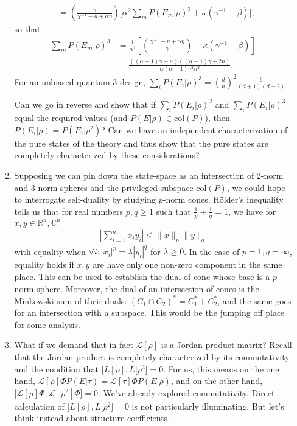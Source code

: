 \documentclass[11pt]{article}
\begin{document}
\begin{enumerate}
\begin{enumerate}
\begin{align}
	&=\left(\frac{\gamma}{\chi^{-1} -\kappa+\alpha \eta}\right)\Bigg[\alpha^2 \sum_m P(E_m|\rho)^3+  \kappa (\gamma^{-1} - \beta)\Bigg],
\end{align}
so that
\begin{align}
\sum_m P(E_m|\rho)^3 &=\frac{1}{\alpha^2}\left[\left(\frac{\chi^{-1} -\kappa+\alpha \eta}{\gamma}\right)	- \kappa (\gamma^{-1} - \beta)\right]\\
&=\frac{((\alpha -1) \gamma +n) ((\alpha -1) \gamma +2 n)}{\alpha  (\alpha +1) \gamma ^2
   n^2}.
\end{align}
For an unbiased quantum 3-design,  $\sum_i P(E_i|\rho)^3 =\left(\frac{d}{n}\right)^2\frac{6}{(d+1)(d+2)}$. 

Can we go in reverse and show that if $\sum_i P(E_i|\rho)^2$ and $\sum_i P(E_i|\rho)^3$ equal the required values (and $P(E|\rho)\in \text{col}(P)$), then $P(E_i|\rho)=\tilde{P}(E_i|\rho^2)$? Can we have an independent characterization of the pure states of the theory and thus show that the pure states are completely characterized by these considerations?
\item  Supposing we can pin down the state-space as an intersection of 2-norm and 3-norm spheres and the privileged subspace $\text{col}(P)$, we could hope to interrogate self-duality by studying $p$-norm cones. H\"older's inequality tells us that for real numbers $p,q\ge 1$ such that $\frac{1}{p}+\frac{1}{q}=1$, we have for $x,y\in \mathbb{R}^n, \mathbb{C}^n$
\begin{align}
\left|\sum_{i=1}^n x_i y_i\right| \leq \lVert x \rVert_p \lVert y \rVert_q
\end{align}
with equality when $\forall i: |x_i|^p = \lambda |y_i|^q$ for $\lambda \ge 0$. In the case of $p=1, q=\infty$, equality holds if $x,y$ are have only one non-zero component in the same place. This can be used to establish the dual of cone whose base is a $p$-norm sphere. Moreover, the dual of an intersection of cones is the Minkowski sum of their duals: $(C_1 \cap C_2)^* = C_1^* + C_2^*$, and the same goes for an intersection with a subspace. This would be the jumping off place for some analysis.

\item What if we demand that in fact $\mathcal{L}[\rho]$ is a Jordan product matrix?  Recall that the Jordan product is completely characterized by its commutativity and the condition that $\big[L[\rho]	, L[\rho^2\big]=0$. For us,  this means on the one hand, $\mathcal{L}[\rho]\Phi P(E|\tau) =  \mathcal{L}[\tau]\Phi P(E|\rho)$, and on the other hand, $\big[\mathcal{L}[\rho]\Phi, \mathcal{L}[\rho^2]\Phi\big]=0$. We've already explored commutativity. Direct calculation of $\big[L[\rho]	, L[\rho^2\big]=0$ is not particularly illuminating. But let's think instead about structure-coefficients.


\end{enumerate}
\end{enumerate}
\end{document}
